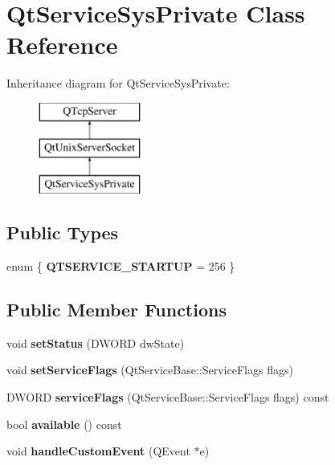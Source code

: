 \hypertarget{class_qt_service_sys_private}{}\section{Qt\+Service\+Sys\+Private Class Reference}
\label{class_qt_service_sys_private}
Inheritance diagram for Qt\+Service\+Sys\+Private\+:\begin{figure}[H]
\begin{center}
\leavevmode
\includegraphics[height=3.000000cm]{class_qt_service_sys_private}
\end{center}
\end{figure}
\subsection*{Public Types}
\begin{DoxyCompactItemize}
\item 
\mbox{\label{class_qt_service_sys_private_af1a08fe54ff9ccc14463eb7ae4089257}} 
enum \{ {\bfseries Q\+T\+S\+E\+R\+V\+I\+C\+E\+\_\+\+S\+T\+A\+R\+T\+UP} = 256
 \}
\end{DoxyCompactItemize}
\subsection*{Public Member Functions}
\begin{DoxyCompactItemize}
\item 
\mbox{\label{class_qt_service_sys_private_a1d33416e766b6f475d36038467bdd69a}} 
void {\bfseries set\+Status} (D\+W\+O\+RD dw\+State)
\item 
\mbox{\label{class_qt_service_sys_private_a8d9929e1406f32ac3f71446ab86d0577}} 
void {\bfseries set\+Service\+Flags} (Qt\+Service\+Base\+::\+Service\+Flags flags)
\item 
\mbox{\label{class_qt_service_sys_private_a8951a293950f651468b69ba142afe017}} 
D\+W\+O\+RD {\bfseries service\+Flags} (Qt\+Service\+Base\+::\+Service\+Flags flags) const
\item 
\mbox{\label{class_qt_service_sys_private_ab023c74e63bc134ff13495891e34f385}} 
bool {\bfseries available} () const
\item 
\mbox{\label{class_qt_service_sys_private_aeb0603830564cf6d730549866020bf0a}} 
void {\bfseries handle\+Custom\+Event} (Q\+Event $\ast$e)
\end{DoxyCompactItemize}
